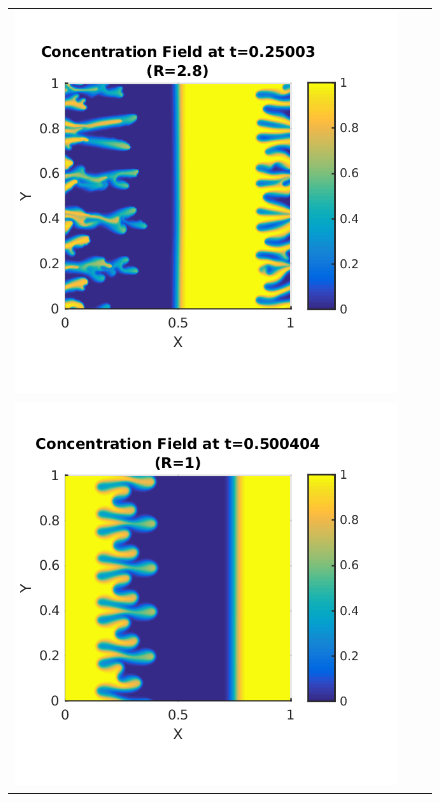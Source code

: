 \documentclass{article}
\begin{document}
\begin{enumerate}
\begin{figure}[!ht]
\begin{tabular}{c c c}
\includegraphics[scale=0.5]{conc28_25.png} \\
\includegraphics[scale=0.5]{conc10_50.png} &

\end{tabular}
\end{figure}
\end{enumerate}
\end{document}
